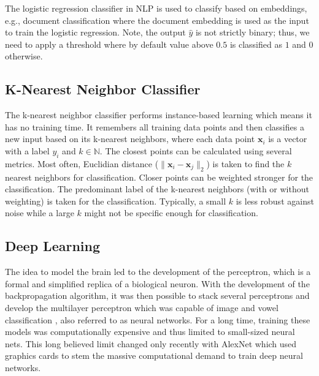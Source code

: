   The logistic regression classifier in NLP is used to classify based on embeddings, e.g., document classification where the document embedding is used as the input to train the logistic regression.
  Note, the output $\hat{y}$ is not strictly binary; thus, we need to apply a threshold where by default value above $0.5$ is classified as $1$ and $0$ otherwise.

\subsection{K-Nearest Neighbor Classifier}
  The k-nearest neighbor classifier performs instance-based learning which means it has no training time.
  It remembers all training data points and then classifies a new input based on its k-nearest neighbors, where each data point $\mathbf{x}_i$ is a vector with a label $y_i$ and $k \in \mathbb{N}$.
  The closest points can be calculated using several metrics.
  Most often, Euclidian distance ($\| \mathbf{x}_i - \mathbf{x}_j\|_2$) is taken to find the $k$ nearest neighbors for classification.
  Closer points can be weighted stronger for the classification.
  The predominant label of the k-nearest neighbors (with or without weighting) is taken for the classification.
  Typically, a small $k$ is less robust against noise while a large $k$ might not be specific enough for classification.

\subsection{Deep Learning}
  The idea to model the brain led to the development of the perceptron, which is a formal and simplified replica of a biological neuron.
  With the development of the backpropagation algorithm, it was then possible to stack several perceptrons and develop the multilayer perceptron which was capable of image and vowel classification \citep{Russell2009}, also referred to as neural networks.
  For a long time, training these models was computationally expensive and thus limited to small-sized neural nets.
  This long believed limit changed only recently with AlexNet \citep{Krizhevsky2012} which used graphics cards to stem the massive computational demand to train deep neural networks.

